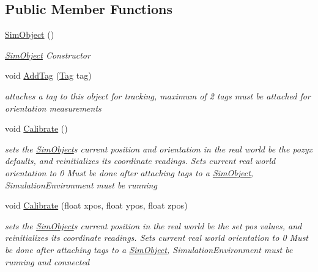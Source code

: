 \subsection*{Public Member Functions}
\begin{DoxyCompactItemize}
\item 
\hyperlink{class_pozyx_positioner_1_1_framework_1_1_sim_object_acc186255ccf8c50a2de3aeaf8e65f645}{Sim\+Object} ()
\begin{DoxyCompactList}\small\item\em \hyperlink{class_pozyx_positioner_1_1_framework_1_1_sim_object}{Sim\+Object} Constructor \end{DoxyCompactList}\item 
void \hyperlink{class_pozyx_positioner_1_1_framework_1_1_sim_object_a46185130a7147410af586622732ad64a}{Add\+Tag} (\hyperlink{class_pozyx_positioner_1_1_framework_1_1_tag}{Tag} tag)
\begin{DoxyCompactList}\small\item\em attaches a tag to this object for tracking, maximum of 2 tags must be attached for orientation measurements \end{DoxyCompactList}\item 
void \hyperlink{class_pozyx_positioner_1_1_framework_1_1_sim_object_ae5a40c80792b6e84ae90cf31e2b5fc8f}{Calibrate} ()
\begin{DoxyCompactList}\small\item\em sets the \hyperlink{class_pozyx_positioner_1_1_framework_1_1_sim_object}{Sim\+Object}\textquotesingle{}s current position and orientation in the real world be the pozyx defaults, and reinitializes its coordinate readings. Sets current real world orientation to 0 Must be done after attaching tags to a \hyperlink{class_pozyx_positioner_1_1_framework_1_1_sim_object}{Sim\+Object}, Simulation\+Environment must be running \end{DoxyCompactList}\item 
void \hyperlink{class_pozyx_positioner_1_1_framework_1_1_sim_object_ad5e3a7c3290c1925d0e7d42a6e8b0111}{Calibrate} (float xpos, float ypos, float zpos)
\begin{DoxyCompactList}\small\item\em sets the \hyperlink{class_pozyx_positioner_1_1_framework_1_1_sim_object}{Sim\+Object}\textquotesingle{}s current position in the real world be the set pos values, and reinitializes its coordinate readings. Sets current real world orientation to 0 Must be done after attaching tags to a \hyperlink{class_pozyx_positioner_1_1_framework_1_1_sim_object}{Sim\+Object}, Simulation\+Environment must be running and connected \end{DoxyCompactList}\item 

\end{DoxyCompactItemize}
